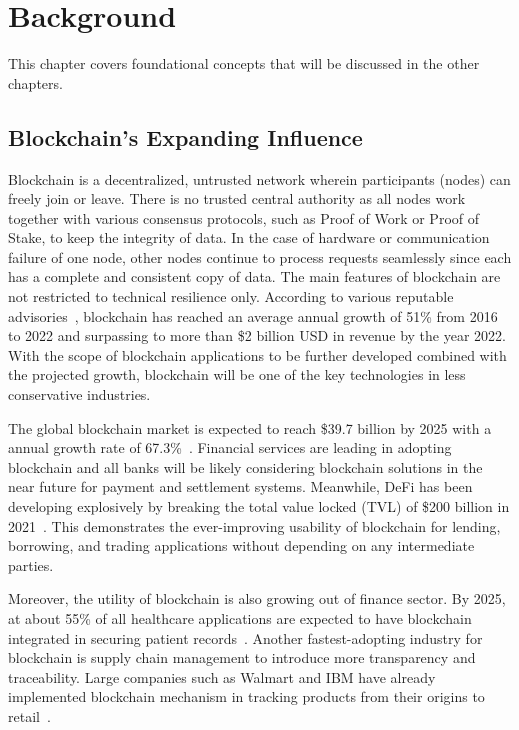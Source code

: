 
\chapter{Background}\label{ch:background}
This chapter covers foundational concepts that will be discussed in the other chapters.

\section{Blockchain's Expanding Influence}
Blockchain is a decentralized, untrusted network wherein participants (nodes) can freely join or leave. There is no trusted central authority as all nodes work together with various consensus protocols, such as Proof of Work or Proof of Stake, to keep the integrity of data. In the case of hardware or communication failure of one node, other nodes continue to process requests seamlessly since each has a complete and consistent copy of data. The main features of blockchain are not restricted to technical resilience only. According to various reputable advisories~\cite{Gartner,Reportlinker}, blockchain has reached an average annual growth of 51\% from 2016 to 2022 and surpassing to more than \$2 billion USD in revenue by the year 2022. With the scope of blockchain applications to be further developed combined with the projected growth, blockchain will be one of the key technologies in less conservative industries.

The global blockchain market is expected to reach \$39.7 billion by 2025 with a annual growth rate of 67.3\%~\cite{GrandViewResearch2020}. Financial services are leading in adopting blockchain and all banks will be likely considering blockchain solutions in the near future for payment and settlement systems. Meanwhile, DeFi has been developing explosively by breaking the total value locked (TVL) of \$200 billion in 2021~\cite{MarketsandMarkets2020}. This demonstrates the ever-improving usability of blockchain for lending, borrowing, and trading applications without depending on any intermediate parties.

Moreover, the utility of blockchain is also growing out of finance sector. By 2025, at about 55\% of all healthcare applications are expected to have blockchain integrated in securing patient records~\cite{XcubeLabs2020}. Another fastest-adopting industry for blockchain is supply chain management to introduce more transparency and traceability. Large companies such as Walmart and IBM have already implemented blockchain mechanism in tracking products from their origins to retail~\cite{Sristy2021}.

